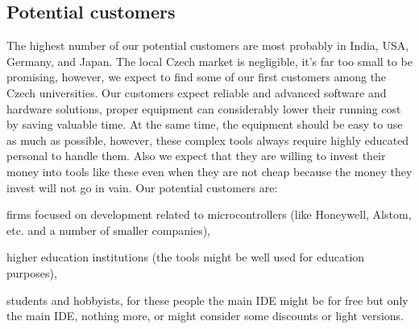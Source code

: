 \documentclass[a4paper,twoside,15pt]{book}
\begin{document}
        \subsection{Potential customers}
            The highest number of our potential customers are most probably in India, USA, Germany, and Japan. The local Czech market is negligible, it's far too small to be promising, however, we expect to find some of our first customers among the Czech universities. Our customers expect reliable and advanced software and hardware solutions, proper equipment can considerably lower their running cost by saving valuable time. At the same time, the equipment should be easy to use as much as possible, however, these complex tools always require highly educated personal to handle them. Also we expect that they are willing to invest their money into tools like these even when they are not cheap because the money they invest will not go in vain.
            Our potential customers are:
            \begin{dinglist}{73}
                \item firms focused on development related to microcontrollers (like Honeywell, Alstom, etc. and a number of smaller companies),
                \item higher education institutions (the tools might be well used for education purposes),
                \item students and hobbyists, for these people the main IDE might be for free but only the main IDE, nothing more, or might consider some discounts or light versions.
            \end{dinglist}
\end{document}

